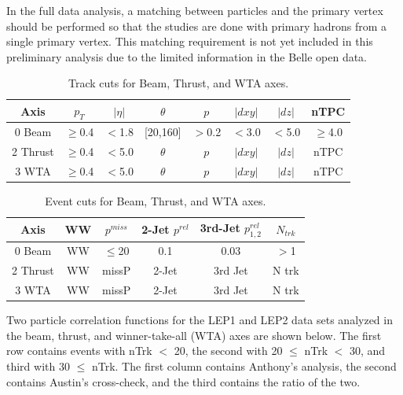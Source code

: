 In the full data analysis, a matching between particles and the primary vertex should be performed so that the studies are done with primary hadrons from a single primary vertex. This matching requirement is not yet included in this preliminary analysis due to the limited information in the Belle open data. 

\begin{table}[h!]\centering
{}

\begin{tabular}{cccccccc}\toprule
Axis & ${p_{T}}$ & $|\eta|$ & $\theta$ & ${p}$ & $|dxy|$ & $|dz|$ & nTPC\\
\midrule
\rowcolor{black!20} {0} Beam & $\geq$0.4 & $<$1.8 & [20,160] & $>$0.2 & $<$3.0 & $<$5.0 & $\geq$4.0 \\
{2} Thrust & $\geq$0.4 & $<$5.0 & $\theta$ & ${p}$ & $|dxy|$ & $|dz|$ & nTPC \\
\rowcolor{black!20} {3} WTA & $\geq$0.4 & $<$5.0 & $\theta$ & ${p}$ & $|dxy|$ & $|dz|$ & nTPC \\
\bottomrule
\end{tabular}
\caption{Track cuts for Beam, Thrust, and WTA axes.}
\end{table}

\begin{table}[h!]\centering
{}

\begin{tabular}{cccccc}\toprule
Axis & WW & ${p^{miss}}$ & 2-Jet ${p^{rel}}$ & 3rd-Jet ${p^{rel}_{1,2}}$ &
$N_{trk}$ \\
\midrule
\rowcolor{black!20} {0} Beam & WW & $\leq$20 & 0.1 & 0.03 & $>$1 \\
{2} Thrust & WW & missP & 2-Jet & 3rd Jet & N trk \\
\rowcolor{black!20} {3} WTA & WW & missP & 2-Jet & 3rd Jet & N trk \\
\bottomrule
\end{tabular}
\caption{Event cuts for Beam, Thrust, and WTA axes.}
\end{table}

Two particle correlation functions for the LEP1 and LEP2 data sets analyzed in the beam, thrust, and winner-take-all (WTA) axes are shown below. The first row contains events with nTrk $<$ 20, the second with 20 $\leq$ nTrk $<$ 30, and third with 30 $\leq$ nTrk. The first column contains Anthony's analysis, the second contains Austin's cross-check, and the third contains the ratio of the two.


